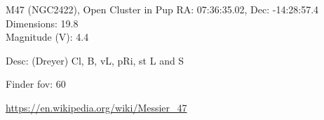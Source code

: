 \begin{block}{M47 (NGC2422), Open Cluster in Pup}
    RA: 07:36:35.02, Dec: -14:28:57.4 \\ 
    Dimensions: 19.8 \\ 
    Magnitude (V): 4.4


    Desc: (Dreyer) Cl, B, vL, pRi, st L and S 

    Finder fov: 60 

    \url{https://en.wikipedia.org/wiki/Messier_47} 
\end{block}
